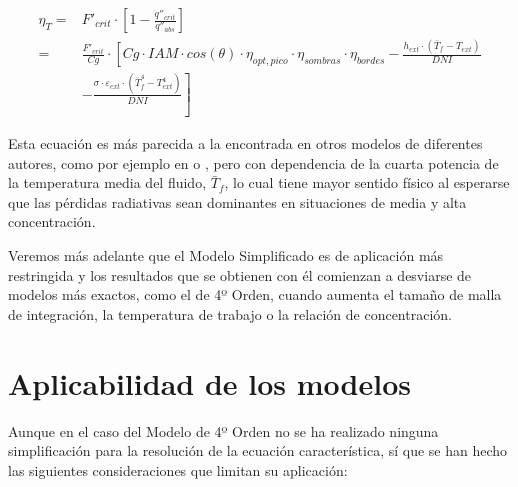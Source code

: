 \begin{equation}
\begin{split}
\eta_{T}	 = & F'_{crit} \cdot \left[1 - \frac{\dot q''_{crit}}{\dot q''_{abs}}\right]  \\
 		 = & \frac{F'_{crit}}{Cg} \cdot \left[Cg \cdot IAM \cdot cos(\theta) \cdot \eta_{opt,pico} \cdot \eta_{sombras} \cdot \eta_{bordes}\right. - \frac{h_{ext}\cdot (\bar{T}_{f}-T_{ext})}{DNI} \\
& \left. - \frac{\sigma \cdot \varepsilon_{ext}\cdot(\bar{T}^{4}_{f}-T^{4}_{ext})}{DNI}\right] 
\end{split}
    \label{eq:modelosimplificado}
\end{equation}

Esta ecuación es más parecida a la encontrada en otros modelos de diferentes autores, como por ejemplo en \cite{hottelEvaluationFlatplateSolar1955} o \cite{fraidenraichImprovedSolutionsTemperature1997a}, pero con dependencia de la cuarta potencia de la temperatura media del fluido, $\bar{T}_{f}$, lo cual tiene mayor sentido físico al esperarse que las pérdidas radiativas sean dominantes en situaciones de media y alta concentración.

Veremos más adelante que el Modelo Simplificado es de aplicación más restringida y los resultados que se obtienen con él comienzan a desviarse de modelos más exactos, como el de 4º Orden, cuando aumenta el tamaño de malla de integración, la temperatura de trabajo o la relación de concentración.

\section{Aplicabilidad de los modelos}
Aunque en el caso del Modelo de 4º Orden no se ha realizado ninguna simplificación para la resolución de la ecuación característica, sí que se han hecho las siguientes consideraciones que limitan su aplicación: 

